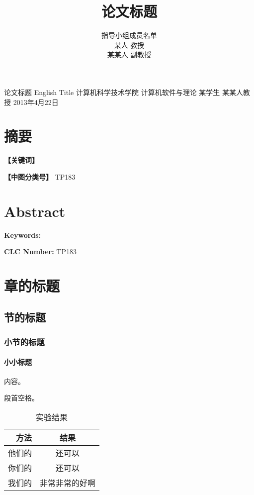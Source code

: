 \documentclass{fudan}
\title{论文标题}
\author{
指导小组成员名单\vspace{1em}\\
某\hspace{1em}人 \hspace{1em} 教\hspace{1em}授\\
某某人 \hspace{1em} 副教授\\
}
\date{}
\begin{document}
%
{论文标题}%
{English Title}%
{计算机科学技术学院}%
{计算机软件与理论}%
{某学生}%
{某某人\hspace{1.5em}教授}%
{2013年4月22日}

\maketitle

\tableofcontents

\frontmatter

\chapter{摘\hspace{1.5em}要}

\textbf{【关键词】}

\textbf{【中图分类号】} TP183

\chapter{Abstract}

\textbf{Keywords:}

\textbf{CLC Number:} TP183

\mainmatter

\chapter{章的标题}

\section{节的标题}

\subsection{小节的标题}

\subsubsection{小小标题}

内容。

段首空格。

\begin{table}[!h]
\begin{center}
\begin{tabular}{r|c}
\hline\hline
方法 & 结果 \\
\hline
他们的 & 还可以 \\
你们的 & 还可以 \\
我们的 & 非常非常的好啊 \\
\hline\hline
\end{tabular}
\end{center}
\caption{实验结果}
\end{table}
\end{document}
